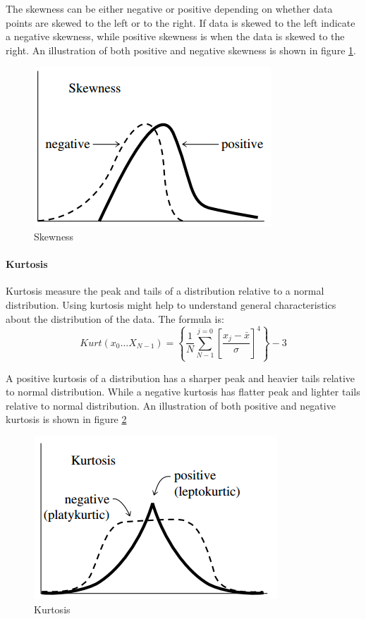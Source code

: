 \documentclass[USenglish]{ifimaster}  %
\begin{document}
The skewness can be either negative or positive depending on whether data points are skewed to the left or to the right. If data is skewed to the left indicate a negative skewness, while positive skewness is when the data is skewed to the right. An illustration of both positive and negative skewness is shown in figure \ref{fig:skew}.
	
	\begin{figure}[h]
		\centering
		\includegraphics[scale=0.8]{Figures/Skewness}
		\caption{Skewness \cite{Press:2007:NRE:1403886}}
		\label{fig:skew}
	\end{figure}
	
	\FloatBarrier
	
\paragraph{Kurtosis}
Kurtosis measure the peak and tails of a distribution relative to a normal distribution. Using kurtosis might help to understand general characteristics about the distribution of the data. The formula is\cite{Press:2007:NRE:1403886}:
	\begin{equation}
	Kurt(x_0\dotsc X_{N-1}) = \left \{ \frac{1}{N}\sum_{N-1}^{j=0}\left [ \frac{x_j-\bar{x}}{\sigma} \right ]^4 \right \}-3
	\label{eq:kurtosis}
	\end{equation}
	
A positive kurtosis of a distribution has a sharper peak and heavier tails relative to normal distribution. While a negative kurtosis has flatter peak and lighter tails relative to normal distribution. An illustration of both positive and negative kurtosis is shown in figure \ref{fig:kurtosis}
	
	
	\begin{figure}[h]
		\centering
		\includegraphics[scale=0.8]{Figures/Kurtosis}
		\caption{Kurtosis \cite{Press:2007:NRE:1403886}}
		\label{fig:kurtosis}
	\end{figure}
	
\end{document}
